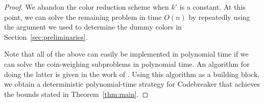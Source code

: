 \documentclass[english,a4paper,11pt]{article}
\newcommand{\comment}[1]{{\bf [#1]}}
\newcommand{\RS}[1]{\comment{\textcolor{red}{RS: #1}}}
\DeclareMathOperator{\eq}{eq}
\newcommand{\assign}{\leftarrow}
\newcommand{\ifLongCites}[2]{#1}
\newcommand{\ifLongCites}[2]{#2}
\begin{document}
{\begin{proof}
We abandon the color reduction scheme when $k'$ is a constant. At this point, we can solve the remaining problem in time $O(n)$ by repeatedly using the argument we used to determine the dummy colors in Section~\ref{sec:preliminaries}.

Note that all of the above can easily be implemented in polynomial time if we can solve the coin-weighing subproblems in polynomial time. An algorithm for doing the latter is given in the work of \ifLongCites{\cite{Bshouty09}}{Bshouty~\cite{Bshouty09}}. Using this algorithm as a building block, we obtain a deterministic polynomial-time strategy for Codebreaker that achieves the bounds stated in Theorem~\ref{thm:main}.
%
%
%
\end{proof}

}
\end{document}
